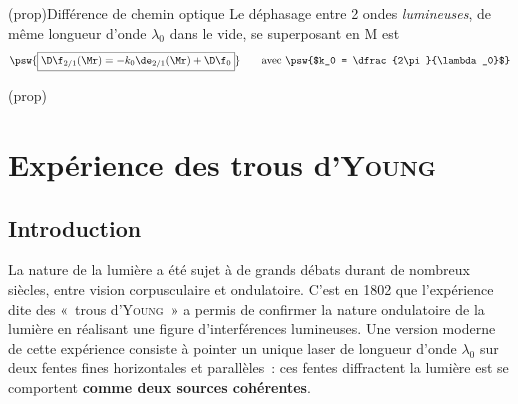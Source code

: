 \documentclass[../../main/main.tex]{subfiles}
\begin{document}
\begin{tcb}(prop){Différence de chemin optique}
	Le déphasage entre 2 ondes \textit{lumineuses}, de même longueur d'onde
	$\lambda_0$ dans le vide, se superposant en M est
	\[
		\psw{%
			\boxed{\D\f_{2/1}(\Mr) = -k_0\de_{2/1}(\Mr) + \D\f_0}
		}
		\tag*{avec \psw{$k_0 = \dfrac{2\pi}{\lambda_0}$}}
	\]
	\smallbreak
	\begin{isd}(prop)
		\psw{%
			\[
				\boxed{\delta_{2/1}(\Mr) = (\SbMr) - (\SaMr)}
			\]
		}%
		\vspace{-15pt}
		\tcblower
		\psw{%
			\[
				\boxed{\D\f_0 = \f_{02}-\f_{01}}
			\]
		}%
		\vspace{-15pt}
	\end{isd}
\end{tcb}

\section{Expérience des trous d'\textsc{Young}}
\subsection{Introduction}

La nature de la lumière a été sujet à de grands débats durant de nombreux
siècles, entre vision corpusculaire et ondulatoire. C'est en 1802 que
l'expérience dite des «~trous d'\textsc{Young}~» a permis de confirmer la nature
ondulatoire de la lumière en réalisant une figure d'interférences
lumineuses. Une version moderne de cette expérience
consiste à pointer un unique laser de longueur d'onde $\lambda_0$ sur deux fentes
fines horizontales et parallèles~: ces fentes diffractent la lumière est se
comportent \textbf{comme deux sources cohérentes}.
\end{document}
